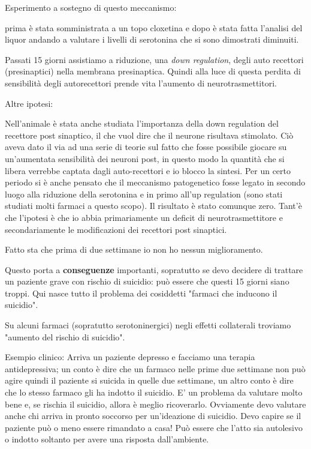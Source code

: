 \begin{itemize}
Esperimento a sostegno di questo meccanismo:

prima è stata somministrata a un topo cloxetina e dopo è stata fatta
l'analisi del liquor andando a valutare i livelli di serotonina che si
sono dimostrati diminuiti.

Passati 15 giorni assistiamo a riduzione, una \emph{down regulation},
degli auto recettori (presinaptici) nella membrana presinaptica. Quindi
alla luce di questa perdita di sensibilità degli autorecettori prende
vita l'aumento di neurotrasmettitori.

Altre ipotesi:

Nell'animale è stata anche studiata l'importanza della down regulation
del recettore post sinaptico, il che vuol dire che il neurone risultava
stimolato. Ciò aveva dato il via ad una serie di teorie sul fatto che
fosse possibile giocare su un'aumentata sensibilità dei neuroni post, in
questo modo la quantità che si libera verrebbe captata dagli
auto-recettori e io blocco la sintesi. Per un certo periodo si è anche
pensato che il meccanismo patogenetico fosse legato in secondo luogo
alla riduzione della serotonina e in primo all'up regulation (sono stati
studiati molti farmaci a questo scopo). Il risultato è stato comunque
zero. Tant'è che l'ipotesi è che io abbia primariamente un deficit di
neurotrasmettitore e secondariamente le modificazioni dei recettori post
sinaptici.

Fatto sta che prima di due settimane io non ho nessun miglioramento.

Questo porta a \textbf{conseguenze} importanti, sopratutto se devo
decidere di trattare un paziente grave con rischio di suicidio: può
essere che questi 15 giorni siano troppi. Qui nasce tutto il problema
dei cosiddetti "farmaci che inducono il suicidio".

Su alcuni farmaci (sopratutto serotoninergici) negli effetti collaterali
troviamo "aumento del rischio di suicidio".

Esempio clinico: Arriva un paziente depresso e facciamo una terapia
antidepressiva; un conto è dire che un farmaco nelle prime due settimane
non può agire quindi il paziente si suicida in quelle due settimane, un
altro conto è dire che lo stesso farmaco gli ha indotto il suicidio. E'
un problema da valutare molto bene e, se rischia il suicidio, allora è
meglio ricoverarlo. Ovviamente devo valutare anche chi arriva in pronto
soccorso per un'ideazione di suicidio. Devo capire se il paziente può o
meno essere rimandato a casa! Può essere che l'atto sia autolesivo o
indotto soltanto per avere una risposta dall'ambiente.


\end{itemize}

